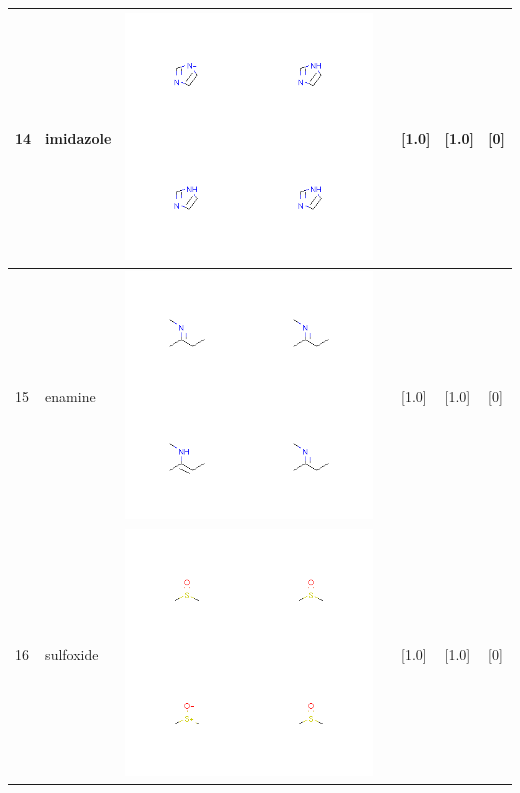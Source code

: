 \begin{longtable}{|l|l|l|l|l|l|l|}
14 & imidazole & \includegraphics[scale=0.6]{imidazoleMV.png} & & [1.0]& [1.0] & [0] \\
\hline
15 & enamine & \includegraphics[scale=0.6]{enamineMV.png} & & [1.0]& [1.0] & [0] \\
\hline
16 & sulfoxide & \includegraphics[scale=0.6]{sulfoxideMV.png} & & [1.0]& [1.0] & [0] \\

\end{longtable}

